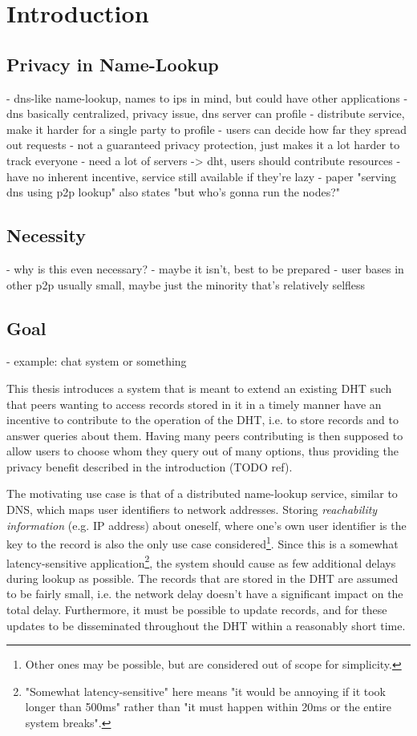 \chapter{Introduction}
\section{Privacy in Name-Lookup}


- dns-like name-lookup, names to ips in mind, but could have other applications
- dns basically centralized, privacy issue, dns server can profile
- distribute service, make it harder for a single party to profile
- users can decide how far they spread out requests
- not a guaranteed privacy protection, just makes it a lot harder to track
  everyone
- need a lot of servers -> dht, users should contribute resources
- have no inherent incentive, service still available if they're lazy
- paper "serving dns using p2p lookup" also states "but who's gonna run the
  nodes?"

\section{Necessity}
- why is this even necessary?
- maybe it isn't, best to be prepared
- user bases in other p2p usually small, maybe just the minority that's
  relatively selfless

\section{Goal}
- example: chat system or something

This thesis introduces a system that is meant to extend an existing \ac{DHT}
such that peers wanting to access records stored in it in a timely manner have
an incentive to contribute to the operation of the \ac{DHT}, i.e. to store
records and to answer queries about them. Having many peers contributing is then
supposed to allow users to choose whom they query out of many options, thus
providing the privacy benefit described in the introduction (TODO ref).

The motivating use case is that of a distributed name-lookup service, similar to
DNS, which maps user identifiers to network addresses. Storing
\emph{reachability information} (e.g. IP address) about oneself, where one's own
user identifier is the key to the record is also the only use case
considered\footnote{Other ones may be possible, but are considered out of scope
for simplicity.}. Since this is a somewhat latency-sensitive
application\footnote{"Somewhat latency-sensitive" here means "it would be
annoying if it took longer than 500ms" rather than "it must happen within 20ms
or the entire system breaks".}, the system should cause as few additional delays
during lookup as possible. The records that are stored in the \ac{DHT} are
assumed to be fairly small, i.e. the network delay doesn't have a significant
impact on the total delay. Furthermore, it must be possible to update records,
and for these updates to be disseminated throughout the \ac{DHT} within a
reasonably short time.

